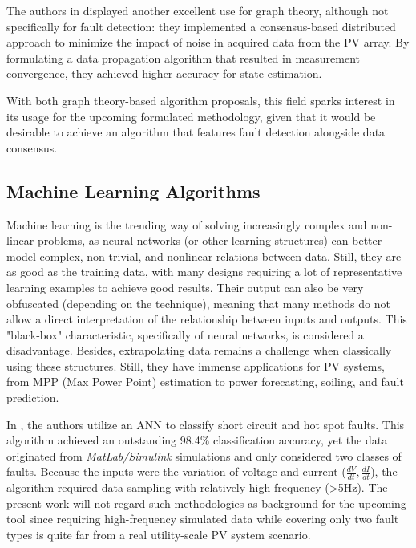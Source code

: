 The authors in \cite{Katoch2018} displayed another excellent use for graph theory, although not specifically for fault detection: they implemented a consensus-based distributed approach to minimize the impact of noise in acquired data from the PV array. By formulating a data propagation algorithm that resulted in measurement convergence, they achieved higher accuracy for state estimation.

With both graph theory-based algorithm proposals, this field sparks interest in its usage for the upcoming formulated methodology, given that it would be desirable to achieve an algorithm that features fault detection alongside data consensus.


\subsection{Machine Learning Algorithms} \label{subsec:machinelearning}

Machine learning is the trending way of solving increasingly complex and non-linear problems, as neural networks (or other learning structures) can better model complex, non-trivial, and nonlinear relations between data. Still, they are as good as the training data, with many designs requiring a lot of representative learning examples to achieve good results. Their output can also be very obfuscated (depending on the technique), meaning that many methods do not allow a direct interpretation of the relationship between inputs and outputs. This "black-box" characteristic, specifically of neural networks, is considered a disadvantage. Besides, extrapolating data remains a challenge when classically using these structures. Still, they have immense applications for PV systems, from MPP (Max Power Point) estimation to power forecasting, soiling, and fault prediction.

In \cite{Kumari2022}, the authors utilize an ANN to classify short circuit and hot spot faults. This algorithm achieved an outstanding 98.4\% classification accuracy, yet the data originated from \textit{MatLab/Simulink} simulations and only considered two classes of faults. Because the inputs were the variation of voltage and current ($\frac{dV}{dt},\frac{dI}{dt}$), the algorithm required data sampling with relatively high frequency (>5Hz). The present work will not regard such methodologies as background for the upcoming tool since requiring high-frequency simulated data while covering only two fault types is quite far from a real utility-scale PV system scenario.

